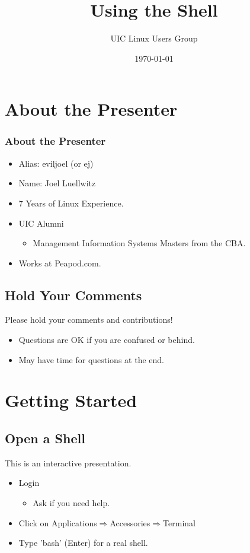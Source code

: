 \documentclass[hyperref={pdfpagelabels=false}]{beamer}
\title{Using the Shell}
\author{UIC Linux Users Group}
\date{\today}
\begin{document}
\frame{\titlepage}
\section{About the Presenter}
\frame
{
    \frametitle{About the Presenter}
    \begin{itemize}
    \item{Alias: eviljoel (or ej)}
    \item{Name: Joel Luellwitz}
    \item{7 Years of Linux Experience.}
    \item{UIC Alumni}
        \begin{itemize}
        \item{Management Information Systems Masters from the CBA.}
        \end{itemize}
    \item{Works at Peapod.com.}
    \end{itemize}
	
}
\subsection{Hold Your Comments}
\frame
{
Please hold your comments and contributions!
    \begin{itemize}
    \item{Questions are OK if you are confused or behind.}
    \item{May have time for questions at the end.}
    \end{itemize}
}
\section{Getting Started}
\subsection{Open a Shell}
\frame
{
    This is an interactive presentation.
    \begin{itemize}
    \item{Login}
        \begin{itemize}
        \item{Ask if you need help.}
        \end{itemize}
    \item{ Click on Applications$\Rightarrow$Accessories$\Rightarrow$Terminal}
    \item{ Type 'bash' (Enter) for a real shell.}
    \end{itemize}
   
}
\end{document}
